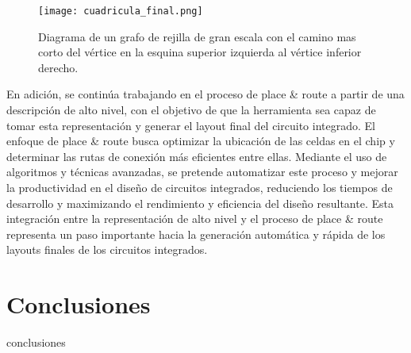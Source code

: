 \documentclass[reprint,amsmath,amssymb,aps]{revtex4-2}
\begin{document}
\begin{figure}[H]
	\centering
	\texttt{[image: cuadricula\_final.png]}
	\caption{Diagrama de un grafo de rejilla de gran escala con el camino mas corto del vértice en la esquina superior izquierda al vértice inferior derecho.}
	\label{cuadricula_final}
\end{figure}

En adición, se continúa trabajando en el proceso de place \& route a partir de una descripción de alto nivel, con el objetivo de que la herramienta sea capaz de tomar esta representación y generar el layout final del circuito integrado. El enfoque de place \& route busca optimizar la ubicación de las celdas en el chip y determinar las rutas de conexión más eficientes entre ellas. Mediante el uso de algoritmos y técnicas avanzadas, se pretende automatizar este proceso y mejorar la productividad en el diseño de circuitos integrados, reduciendo los tiempos de desarrollo y maximizando el rendimiento y eficiencia del diseño resultante. Esta integración entre la representación de alto nivel y el proceso de place \& route representa un paso importante hacia la generación automática y rápida de los layouts finales de los circuitos integrados.

\section{Conclusiones}
conclusiones
  

\nocite{*}
\end{document}
